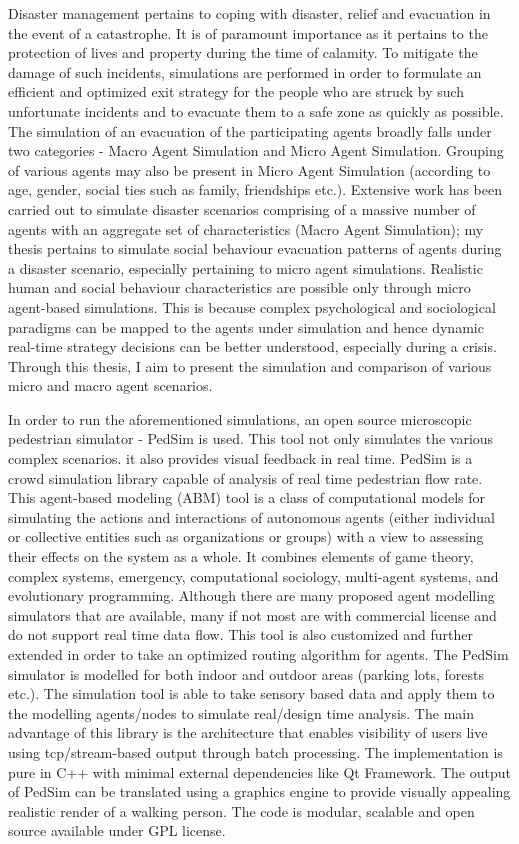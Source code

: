 Disaster management pertains to coping with disaster, relief and evacuation in the event of a catastrophe. It is of paramount importance as it pertains to the protection of lives and property during the time of calamity. To mitigate the damage of such incidents, simulations are performed in order to formulate an efficient and optimized exit strategy for the people who are struck by such unfortunate incidents and to evacuate them to a safe zone as quickly as possible. The simulation of an evacuation of the participating agents broadly falls under two categories - Macro Agent Simulation and Micro Agent Simulation. Grouping of various agents may also be present in Micro Agent Simulation (according to age, gender, social ties such as family, friendships etc.). Extensive work has been carried out to simulate disaster scenarios comprising of a massive number of agents with an aggregate set of characteristics (Macro Agent Simulation); my thesis pertains to simulate social behaviour evacuation patterns of agents during a disaster scenario, especially pertaining to micro agent simulations. Realistic human and social behaviour characteristics are possible only through micro agent-based simulations. This is because complex psychological and sociological paradigms can be mapped to the agents under simulation and hence dynamic real-time strategy decisions can be better understood, especially during a crisis. Through this thesis, I aim to present the simulation and comparison of various micro and macro agent scenarios.

In order to run the aforementioned simulations, an open source microscopic pedestrian simulator - PedSim is used. This tool not only simulates the various complex scenarios. it also provides visual feedback in real time. PedSim is a crowd simulation library capable of analysis of real time pedestrian flow rate. This agent-based modeling (ABM) tool is a class of computational models for simulating the actions and interactions of autonomous agents (either individual or collective entities such as organizations or groups) with a view to assessing their effects on the system as a whole. It combines elements of game theory, complex systems, emergency, computational sociology, multi-agent systems, and evolutionary programming. Although there are many proposed agent modelling simulators that are available, many if not most are with commercial license and do not support real time data flow. This tool is also customized and further extended in order to take an optimized routing algorithm for agents. The PedSim simulator is modelled for both indoor and outdoor areas (parking lots, forests etc.). The simulation tool is able to take sensory based data and apply them to the modelling agents/nodes to simulate real/design time analysis. The main advantage of this library is the architecture that enables visibility of users live using tcp/stream-based output through batch processing. The implementation is pure in C++ with minimal external dependencies like Qt Framework. The output of PedSim can be translated using a graphics engine to provide visually appealing realistic render of a walking person. The code is modular, scalable and open source available under GPL license. 

